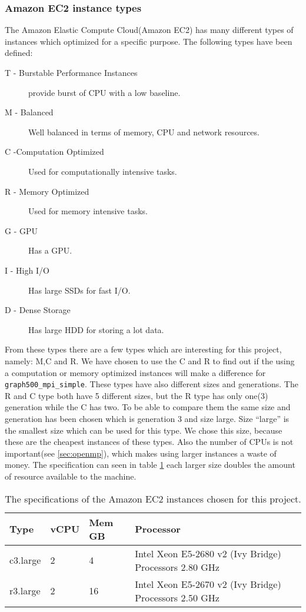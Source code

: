 \subsubsection{Amazon EC2 instance types}
\label{hw:Amazon}
The Amazon Elastic Compute Cloud(Amazon EC2) has many different types of instances which optimized for a specific purpose\cite{amazon-instances}. The following types have been defined:
\begin{description}
\item[T - Burstable Performance Instances] provide burst of CPU with a low baseline.
\item[M - Balanced] Well balanced in terms of memory, CPU and network resources.
\item[C -Computation Optimized] Used for computationally intensive tasks.
\item[R - Memory Optimized] Used for memory intensive tasks.
\item[G - GPU] Has a GPU.
\item[I - High I/O] Has large SSDs for fast I/O.
\item[D - Dense Storage] Has large HDD for storing a lot data.
\end{description}
From these types there are a few types which are interesting for this project, namely: M,C and R. We have chosen to use the C and R to find out if the using a computation or memory optimized instances will make a difference for \texttt{graph500\_mpi\_simple}.
These types have also different sizes and generations. The R and C type both have 5 different sizes, but the R type has only one(3) generation while the C has two. To be able to compare them the same size and generation has been chosen which is generation 3 and size large. Size ``large'' is the smallest size which can be used for this type. We chose this size, because these are the cheapest instances of these types. Also the number of CPUs is not important(see \ref{sec:openmp}), which makes using larger instances a waste of money. The specification can seen in table \ref{tab:specs-amazon} each larger size doubles the amount of resource available to the machine.

\begin{table}[!h]
\begin{center}
\begin{tabular}{|l|l|l|l|}
\hline
Type & vCPU & Mem GB & Processor \\ \hline
c3.large & 2 & 4 & Intel Xeon E5-2680 v2 (Ivy Bridge) Processors 2.80 GHz \\ \hline
r3.large & 2 & 16 & Intel Xeon E5-2670 v2 (Ivy Bridge) Processors 2.50 GHz \\ \hline
\end{tabular}
\end{center}
\caption{The specifications of the Amazon EC2 instances chosen for this project.}
\label{tab:specs-amazon}
\end{table}
